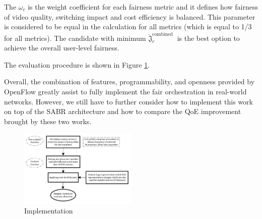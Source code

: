 \documentclass{article}
\begin{document}
The $\omega_c$ is the weight coefficient for each fairness metric and it defines how fairness of video quality, switching impact and cost efficiency is balanced. This parameter is considered to be equal in the calculation for all metrics (which is equal to 1/3 for all metrics).
The candidate with minimum $\ddot{\mathfrak{J}}_{c}^{\text {combined }}$ is the best option to achieve the overall user-level fairness. 

The evaluation procedure is shown in Figure \ref{fig:scale-implement}.




Overall, the combination of features, programmability, and openness provided by OpenFlow greatly assist to fully implement the fair orchestration in real-world networks. However, we still have to further consider how to implement this work on top of the SABR architecture and how to compare the QoE improvement brought by these two works. 

\begin{figure}
\centering
\includegraphics[width=0.5\textwidth]{images/scale_implement.png}
\caption{Implementation}
\label{fig:scale-implement}
\end{figure}

\printbibliography
\end{document}
